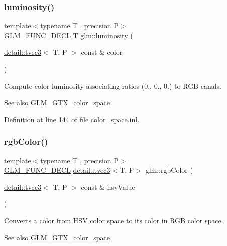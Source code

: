 \subsubsection{\texorpdfstring{luminosity()}{luminosity()}}
{\footnotesize\ttfamily template$<$typename T , precision P$>$ \\
\hyperlink{setup_8hpp_ab2d052de21a70539923e9bcbf6e83a51}{G\+L\+M\+\_\+\+F\+U\+N\+C\+\_\+\+D\+E\+CL} T glm\+::luminosity (\begin{DoxyParamCaption}\item[{\hyperlink{structglm_1_1detail_1_1tvec3}{detail\+::tvec3}$<$ T, P $>$ const \&}]{color }\end{DoxyParamCaption})}

Compute color luminosity associating ratios (0., 0., 0.) to R\+GB canals. \begin{DoxySeeAlso}{See also}
\hyperlink{group__gtx__color__space}{G\+L\+M\+\_\+\+G\+T\+X\+\_\+color\+\_\+space} 
\end{DoxySeeAlso}


Definition at line 144 of file color\+\_\+space.\+inl.

\mbox{\label{group__gtx__color__space_gafe29cc37c2675aee66c9f9ae3e5e7294}} 
\subsubsection{\texorpdfstring{rgb\+Color()}{rgbColor()}}
{\footnotesize\ttfamily template$<$typename T , precision P$>$ \\
\hyperlink{setup_8hpp_ab2d052de21a70539923e9bcbf6e83a51}{G\+L\+M\+\_\+\+F\+U\+N\+C\+\_\+\+D\+E\+CL} \hyperlink{structglm_1_1detail_1_1tvec3}{detail\+::tvec3}$<$T, P$>$ glm\+::rgb\+Color (\begin{DoxyParamCaption}\item[{\hyperlink{structglm_1_1detail_1_1tvec3}{detail\+::tvec3}$<$ T, P $>$ const \&}]{hsv\+Value }\end{DoxyParamCaption})}

Converts a color from H\+SV color space to its color in R\+GB color space. \begin{DoxySeeAlso}{See also}
\hyperlink{group__gtx__color__space}{G\+L\+M\+\_\+\+G\+T\+X\+\_\+color\+\_\+space} 
\end{DoxySeeAlso}


